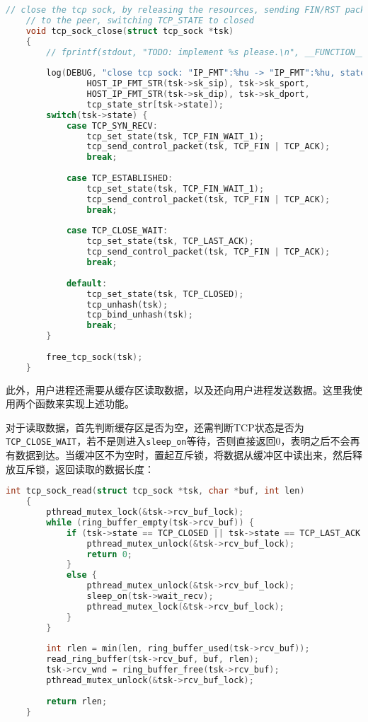 \documentclass[UTF8]{report}
\begin{document}
\begin{lstlisting}[language=C]
    // close the tcp sock, by releasing the resources, sending FIN/RST packet
    // to the peer, switching TCP_STATE to closed
    void tcp_sock_close(struct tcp_sock *tsk)
    {
        // fprintf(stdout, "TODO: implement %s please.\n", __FUNCTION__);
    
        log(DEBUG, "close tcp sock: "IP_FMT":%hu -> "IP_FMT":%hu, state: %s.",
                HOST_IP_FMT_STR(tsk->sk_sip), tsk->sk_sport,
                HOST_IP_FMT_STR(tsk->sk_dip), tsk->sk_dport,
                tcp_state_str[tsk->state]);
        switch(tsk->state) {
            case TCP_SYN_RECV:
                tcp_set_state(tsk, TCP_FIN_WAIT_1);
                tcp_send_control_packet(tsk, TCP_FIN | TCP_ACK);
                break;
    
            case TCP_ESTABLISHED:
                tcp_set_state(tsk, TCP_FIN_WAIT_1);
                tcp_send_control_packet(tsk, TCP_FIN | TCP_ACK);
                break;
    
            case TCP_CLOSE_WAIT:
                tcp_set_state(tsk, TCP_LAST_ACK);
                tcp_send_control_packet(tsk, TCP_FIN | TCP_ACK);
                break;
    
            default:
                tcp_set_state(tsk, TCP_CLOSED);
                tcp_unhash(tsk);
                tcp_bind_unhash(tsk);
                break;
        }
    
        free_tcp_sock(tsk);
    }
\end{lstlisting}

此外，用户进程还需要从缓存区读取数据，以及还向用户进程发送数据。这里我使用两个函数来实现上述功能。

对于读取数据，首先判断缓存区是否为空，还需判断TCP状态是否为\texttt{TCP_CLOSE_WAIT}，若不是则进入\texttt{sleep_on}等待，否则直接返回0，表明之后不会再有数据到达。当缓冲区不为空时，置起互斥锁，将数据从缓冲区中读出来，然后释放互斥锁，返回读取的数据长度：

\begin{lstlisting}[language=C]
    int tcp_sock_read(struct tcp_sock *tsk, char *buf, int len)
    {
        pthread_mutex_lock(&tsk->rcv_buf_lock);
        while (ring_buffer_empty(tsk->rcv_buf)) {
            if (tsk->state == TCP_CLOSED || tsk->state == TCP_LAST_ACK || tsk->state == TCP_CLOSE_WAIT) {
                pthread_mutex_unlock(&tsk->rcv_buf_lock);
                return 0;
            }
            else {
                pthread_mutex_unlock(&tsk->rcv_buf_lock);
                sleep_on(tsk->wait_recv);
                pthread_mutex_lock(&tsk->rcv_buf_lock);
            }
        }
    
        int rlen = min(len, ring_buffer_used(tsk->rcv_buf));
        read_ring_buffer(tsk->rcv_buf, buf, rlen);
        tsk->rcv_wnd = ring_buffer_free(tsk->rcv_buf);
        pthread_mutex_unlock(&tsk->rcv_buf_lock);
    
        return rlen;
    }
\end{lstlisting}
\end{document}
